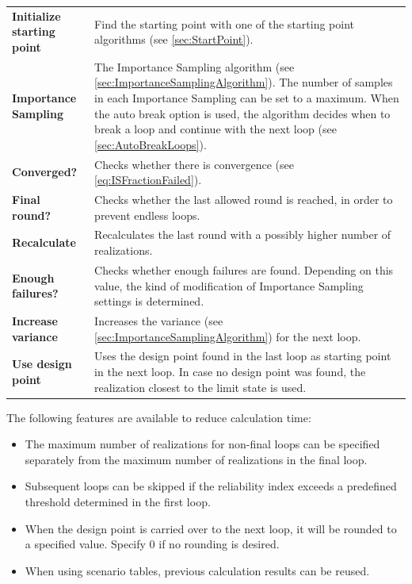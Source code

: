 {\begin{longtable}{p{40mm}p{\textwidth-24pt-40mm}}  
	\textbf{Initialize starting point} & Find the starting point with one of the starting point algorithms (see \autoref{sec:StartPoint}). \\
	\textbf{Importance Sampling} & The Importance Sampling algorithm (see \autoref{sec:ImportanceSamplingAlgorithm}). The number of samples in each Importance Sampling can be set to a maximum. When the auto break option is used, the algorithm decides when to break a loop and continue with the next loop (see \autoref{sec:AutoBreakLoops}). \\
	\textbf{Converged?} & Checks whether there is convergence (see \autoref{eq:ISFractionFailed}).  \\
	\textbf{Final round?} & Checks whether the last allowed round is reached, in order to prevent endless loops. \\
	\textbf{Recalculate} & Recalculates the last round with a possibly higher number of realizations. \\
	\textbf{Enough failures?} & Checks whether enough failures are found. Depending on this value, the kind of modification of Importance Sampling settings is determined. \\
	\textbf{Increase variance} & Increases the variance (see \autoref{sec:ImportanceSamplingAlgorithm}) for the next loop. \\
	\textbf{Use design point} & Uses the design point found in the last loop as starting point in the next loop. In case no design point was found, the realization closest to the limit state is used. \\
\end{longtable}

The following features are available to reduce calculation time:

\begin{itemize}
\item The maximum number of realizations for non-final loops can be specified separately from the maximum number of realizations in the final loop.
\item Subsequent loops can be skipped if the reliability index exceeds a predefined threshold determined in the first loop.
\item When the design point is carried over to the next loop, it will be rounded to a specified value. Specify $0$ if no rounding is desired.
\item When using scenario tables, previous calculation results can be reused.
\end{itemize}

}
